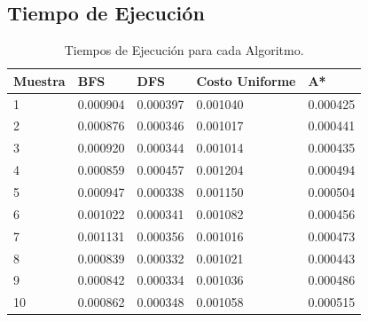 \documentclass[letter, titlepage, 10pt]{article}
\begin{document}
\begin{appendices}
  \subsection{Tiempo de Ejecución}

\begin{table}[H]
\begin{center}
\begin{tabular}{|l|l|l|l|l|}
\hline
\textbf{Muestra} & \textbf{BFS} & \textbf{DFS}  & \textbf{Costo Uniforme}   & \textbf{A*}   \\ \hline
1                & 0.000904     & 0.000397      & 0.001040                  & 0.000425      \\ \hline
2                & 0.000876     & 0.000346      & 0.001017                  & 0.000441      \\ \hline
3                & 0.000920     & 0.000344      & 0.001014                  & 0.000435      \\ \hline
4                & 0.000859     & 0.000457      & 0.001204                  & 0.000494      \\ \hline
5                & 0.000947     & 0.000338      & 0.001150                  & 0.000504      \\ \hline
6                & 0.001022     & 0.000341      & 0.001082                  & 0.000456      \\ \hline
7                & 0.001131     & 0.000356      & 0.001016                  & 0.000473      \\ \hline
8                & 0.000839     & 0.000332      & 0.001021                  & 0.000443      \\ \hline
9                & 0.000842     & 0.000334      & 0.001036                  & 0.000486      \\ \hline
10               & 0.000862     & 0.000348      & 0.001058                  & 0.000515      \\ \hline
\end{tabular}
\caption{Tiempos de Ejecución para cada Algoritmo.}
\end{center}
\end{table}


\end{appendices}
\end{document}
